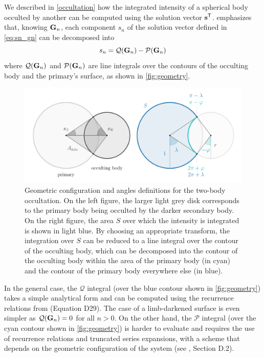\documentclass[modern]{aastex631}
\begin{document}
We described in \autoref{occultation} how the integrated intensity of a spherical body occulted by another can be computed using the solution vector ${\mathbf{s}}^\mathsf{T}$. \cite{pal2012} emphasizes that, knowing ${\mathbf{G}}_n$, each component $s_n$ of the solution vector defined in \autoref{eq:sn_gn} can be decomposed into
\begin{equation}
    \label{eq:QP}
    s_n = \mathcal{Q}(\bvec{G}_n) - \mathcal{P}(\bvec{G}_n)
\end{equation}
where $\mathcal{Q}({\mathbf{G}}_n)$ and $\mathcal{P}({\mathbf{G}}_n)$ are line integrals over the contours of the occulting body and the primary's surface, as shown in \autoref{fig:geometry}.
%
\begin{figure}[H]
    \begin{center}
        \includegraphics[width=\textwidth]{../workflows/geometry/figures/occultation_geometry.pdf}
        \caption{Geometric configuration and angles definitions for the two-body occultation. On the left figure, the larger light grey disk corresponds to the primary body being occulted by the darker secondary body. On the right figure, the area $S$ over which the intensity is integrated is shown in light blue. By choosing an appropriate transform, the integration over $S$ can be reduced to a line integral over the contour of the occulting body, which can be decomposed into the contour of the occulting body within the area of the primary body (in cyan) and the contour of the primary body everywhere else (in blue). }
        \label{fig:geometry}
    \end{center}
\end{figure}
%
In the general case, the $\mathcal{Q}$ integral (over the blue contour shown in \autoref{fig:geometry}) takes a simple analytical form and can be computed using the recurrence relations from \cite{starry} (Equation D29). The case of a limb-darkened surface is even simpler as $\mathcal{Q}({\mathbf{G}}_n) = 0$ for all $n > 0$. On the other hand, the $\mathcal{P}$ integral (over the cyan contour shown in \autoref{fig:geometry}) is harder to evaluate and requires the use of recurrence relations and truncated series expansions, with a scheme that depends on the geometric configuration of the system (see \citealt{starry}, Section D.2).\\\\
\end{document}
